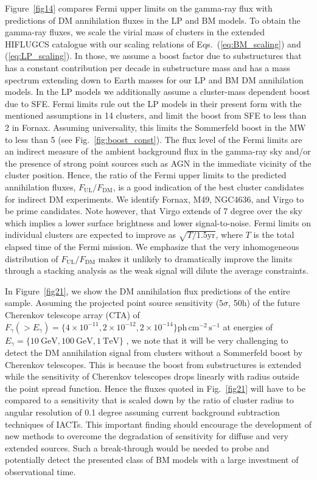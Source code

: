\documentclass[10pt,aps,pra,reprint,amsmath,amsfonts,amssymb,showpacs,nofootinbib,floatfix]{revtex4-1}
\newcommand{\rmn}{\mathrm}
\begin{document}
Figure~\ref{fig14} compares Fermi upper limits on the gamma-ray flux
with predictions of DM annihilation fluxes in the LP and BM models.
To obtain the gamma-ray fluxes, we scale the virial mass of clusters
in the extended HIFLUGCS catalogue \cite{2002ApJ...567..716R} with our
scaling relations of Eqs.~(\ref{eq:BM_scaling}) and
(\ref{eq:LP_scaling}). In those, we assume a boost factor due to
substructures that has a constant contribution per decade in
substructure mass and has a mass spectrum extending down to Earth
masses for our LP and BM DM annihilation models. In the LP models we
additionally assume a cluster-mass dependent boost due to SFE. Fermi
limits rule out the LP models in their present form with the mentioned
assumptions in 14 clusters, and limit the boost from SFE to less than
2 in Fornax. Assuming universality, this limits the Sommerfeld boost
in the MW to less than 5 (see Fig.~\ref{fig:boost_const}).  The flux
level of the Fermi limits are an indirect measure of the ambient
background flux in the gamma-ray sky and/or the presence of strong
point sources such as AGN in the immediate vicinity of the cluster
position. Hence, the ratio of the Fermi upper limits to the predicted
annihilation fluxes, $F_{\mathrm{UL}}/F_{\mathrm{DM}}$, is a good
indication of the best cluster candidates for indirect DM
experiments. We identify Fornax, M49, NGC4636, and Virgo to be prime
candidates. Note however, that Virgo extends of 7 degree over the sky
which implies a lower surface brightness and lower signal-to-noise.
Fermi limits on individual clusters are expected to improve as
$\sqrt{T/1.5 \mathrm{yr}}$, where $T$ is the total elapsed time of the
Fermi mission. We emphasize that the very inhomogeneous distribution
of $F_{\mathrm{UL}}/ F_{\mathrm{DM}}$ makes it unlikely to
dramatically improve the limits through a stacking analysis as the
weak signal will dilute the average constraints.

In Figure~\ref{fig21}, we show the DM annihilation flux predictions of
the entire sample.  Assuming the projected point source sensitivity
($5\sigma$, 50h) of the future Cherenkov telescope array (CTA) of
$F_\gamma(>E_\gamma) = \{4\times10^{-11}, 2\times10^{-12},
2\times10^{-14}\} \rmn{ph}\,\rmn{cm}^{-2}\,\rmn{s}^{-1}$ at energies
of $E_\gamma=\{10~\rmn{GeV}, 100~\rmn{GeV}, 1~\rmn{TeV}\}$
\cite{2009arXiv0908.1410D}, we note that it will be very challenging
to detect the DM annihilation signal from clusters without a
Sommerfeld boost by Cherenkov telescopes.  This is because the boost
from substructures is extended while the sensitivity of Cherenkov
telescopes drops linearly with radius outside the point spread
function. Hence the fluxes quoted in Fig.~\ref{fig21} will have to be
compared to a sensitivity that is scaled down by the ratio of cluster
radius to angular resolution of 0.1 degree assuming current background
subtraction techniques of IACTs.  This important finding should
encourage the development of new methods to overcome the degradation
of sensitivity for diffuse and very extended sources. Such a
break-through would be needed to probe and potentially detect the
presented class of BM models with a large investment of observational
time.
\end{document}
